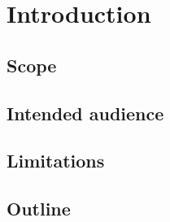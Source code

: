 
\chapter{Introduction} %

\label{chap:introd} %






\section{Scope}
\section{Intended audience}


\section{Limitations}
\section{Outline}

